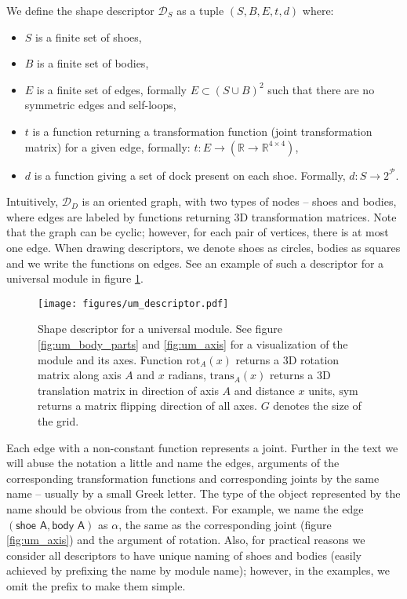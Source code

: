We define the shape descriptor $\mathcal{D}_S$ as a tuple $(S, B, E, t, d)$
where:
\begin{itemize}
    \item $S$ is a finite set of shoes,
    \item $B$ is a finite set of bodies,
    \item $E$ is a finite set of edges, formally $E \subset (S\cup B)^2$ such
    that there are no symmetric edges and self-loops,
    \item $t$ is a function returning a transformation function (joint
    transformation matrix) for a given edge, formally: $t:
    E\rightarrow(\mathds{R}\rightarrow\mathds{R}^{4\times4})$,
    \item $d$ is a function giving a set of dock present on each shoe. Formally,
    $d: S\rightarrow 2^\mathcal{P}$.
\end{itemize}
Intuitively, $\mathcal{D}_D$ is an oriented graph, with two types of nodes --
shoes and bodies, where edges are labeled by functions returning 3D
transformation matrices. Note that the graph can be cyclic; however, for each
pair of vertices, there is at most one edge. When drawing descriptors, we denote
shoes as circles, bodies as squares and we write the functions on edges. See
an example of such a descriptor for a universal module in figure
\ref{fig:um_descriptor}.

\begin{figure}[t]
    \centering
    \texttt{[image: figures/um\_descriptor.pdf]}
    \caption{Shape descriptor for a universal module. See figure
    \ref{fig:um_body_parts} and \ref{fig:um_axis} for a visualization of the
    module and its axes. Function $\text{rot}_A(x)$ returns a 3D rotation matrix
    along axis $A$ and $x$ radians, $\text{trans}_A(x)$ returns a 3D translation
    matrix in direction of axis $A$ and distance $x$ units, $\text{sym}$ returns
    a matrix flipping direction of all axes. $G$ denotes the size of the grid.}
    \label{fig:um_descriptor}
\end{figure}

Each edge with a non-constant function represents a joint. Further in the text
we will abuse the notation a little and name the edges, arguments of the
corresponding transformation functions and corresponding joints by the same name
-- usually by a small Greek letter. The type of the object represented by the
name should be obvious from the context. For example, we name the edge
$(\textsf{shoe A}, \textsf{body A})$ as $\alpha$, the same as the corresponding
joint (figure \ref{fig:um_axis}) and the argument of rotation. Also, for
practical reasons we consider all descriptors to have unique naming of shoes and
bodies (easily achieved by prefixing the name by module name); however, in the
examples, we omit the prefix to make them simple.


